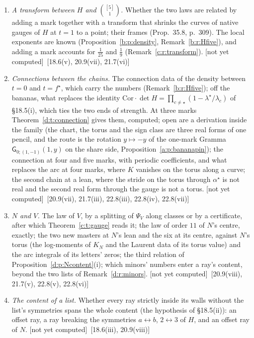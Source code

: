 \documentclass[11pt]{article}
\newcommand{\sG}{\mathsf G}
\theoremstyle{plain}
\theoremstyle{definition}
\theoremstyle{remark}
\newcommand{\notyet}{\textup{[not yet computed]}}
\begin{document}
\begin{enumerate}[label=\textbf{O\arabic*},ref=O\arabic*,leftmargin=*,itemsep=4pt]
\item\label{o:transform} \emph{A transform between $H$ and $\binom{[5]}1$.} Whether the two laws are related by adding a mark together with a transform that shrinks the curves of native gauges of $H$ at $t=1$ to a point; their frames (Prop.~35.8, p.~309). The local exponents are known (Proposition~\ref{b:p:density}, Remark~\ref{b:r:Hfive}), and adding a mark accounts for $\frac1{25}$ and $\frac19$ (Remark~\ref{c:r:transform}). \notyet\ {\small[18.6(v), 20.9(vii), 21.7(vi)]}
\item\label{o:connection} \emph{Connections between the chains.} The connection data of the density between $t=0$ and $t=f^\star$, which carry the numbers (Remark~\ref{b:r:Hfive}); off the bananas, what replaces the identity $\mathrm{Cor}\cdot\det H=\prod_{c\neq\star}(1-\lambda^\star/\lambda_c)$ of \S18.5(i), which ties the two ends of strength. At three marks Theorem~\ref{d:t:connection} gives them, computed; open are a derivation inside the family (the chart, the torus and the sign class are three real forms of one pencil, and the route is the rotation $y\mapsto-y$ of the one-mark Gramma $\sG_{0;(1,-1)}(1,y)$ on the share side, Proposition~\ref{a:p:bananapin}); the connection at four and five marks, with periodic coefficients, and what replaces the arc at four marks, where $K$ vanishes on the torus along a curve; the second chain at a lean, where the stride on the torus through $\alpha^\star$ is not real and the second real form through the gauge is not a torus. \notyet\ {\small[20.9(vii), 21.7(iii), 22.8(iii), 22.8(iv), 22.8(vii)]}
\item\label{o:NV} \emph{$N$ and $V$.} The law of $V$, by a splitting of $\Psi_V$ along classes or by a certificate, after which Theorem~\ref{c:t:gauge} reads it; the law of order $11$ of $N$'s centre, exactly; the two new masters at $N$'s lean and the six at its centre, against $N$'s torus (the log-moments of $K_N$ and the Laurent data of its torus value) and the arc integrals of its letters' zeros; the third relation of Proposition~\ref{d:p:Ncontent}(i); which minors' numbers enter a ray's content, beyond the two lists of Remark~\ref{d:r:minors}. \notyet\ {\small[20.9(viii), 21.7(v), 22.8(v), 22.8(vi)]}
\item\label{o:content} \emph{The content of a list.} Whether every ray strictly inside its walls without the list's symmetries spans the whole content (the hypothesis of \S18.5(ii)): an offset ray, a ray breaking the symmetries $a\leftrightarrow b$, $2\leftrightarrow3$ of $H$, and an offset ray of $N$. \notyet\ {\small[18.6(iii), 20.9(viii)]}

\end{enumerate}
\end{document}

